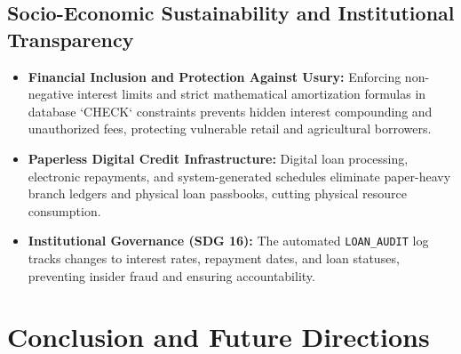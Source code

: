 \documentclass[11pt,a4paper]{report}
\begin{document}
\subsection{Socio-Economic Sustainability and Institutional Transparency}
\begin{itemize}
    \item \textbf{Financial Inclusion and Protection Against Usury:} Enforcing non-negative interest limits and strict mathematical amortization formulas in database `CHECK` constraints prevents hidden interest compounding and unauthorized fees, protecting vulnerable retail and agricultural borrowers.
    \item \textbf{Paperless Digital Credit Infrastructure:} Digital loan processing, electronic repayments, and system-generated schedules eliminate paper-heavy branch ledgers and physical loan passbooks, cutting physical resource consumption.
    \item \textbf{Institutional Governance (SDG 16):} The automated \texttt{LOAN\_AUDIT} log tracks changes to interest rates, repayment dates, and loan statuses, preventing insider fraud and ensuring accountability.
\end{itemize}

\section{Conclusion and Future Directions}
\end{document}
